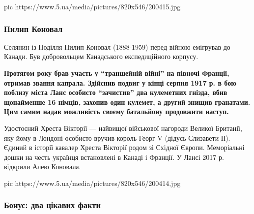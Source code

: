 \ifcmt
pic https://www.5.ua/media/pictures/820x546/200415.jpg
\fi

\subsubsection{Пилип Коновал}


Селянин із Поділля Пилип Коновал (1888-1959) перед війною емігрував до
Канади. Був добровольцем Канадського експедиційного корпусу.

\begin{leftbar}
	\bfseries
Протягом року брав участь у \enquote{траншейній війні} на півночі Франції,
отримав звання капрала. Здійснив подвиг у кінці серпня 1917 р. в бою
поблизу міста Ланс особисто \enquote{зачистив} два кулеметних гнізда, вбив
щонайменше 16 німців, захопив один кулемет, а другий знищив гранатами.
Цим самим надав можливість своєму батальйону продовжити наступ.
\end{leftbar}

Удостоєний Хреста Вікторії --- найвищої військової нагороди Великої
Британії, яку йому в Лондоні особисто вручив король Георг V (дідусь
Єлизавети ІІ). Єдиний в історії кавалер Хреста Вікторії родом зі Східної
Європи. Меморіальні дошки на честь українця встановлені в Канаді і
Франції. У Лансі 2017 р. відкрили Алею Коновала.

\ifcmt
pic https://www.5.ua/media/pictures/820x546/200414.jpg
\fi

\subsubsection{Бонус: два цікавих факти}

